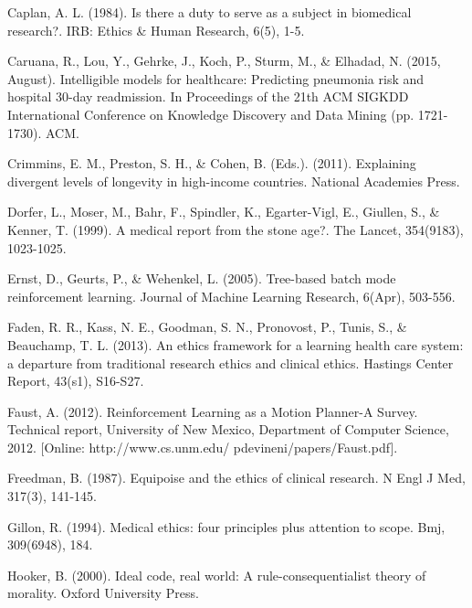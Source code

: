 \documentclass[]{spie}  %
\begin{document}
\indent Caplan, A. L. (1984). Is there a duty to serve as a subject in biomedical research?. IRB: Ethics & Human Research, 6(5), 1-5.

\skiplinehalf

\indent Caruana, R., Lou, Y., Gehrke, J., Koch, P., Sturm, M., & Elhadad, N. (2015, August). Intelligible models for healthcare: Predicting pneumonia risk and hospital 30-day readmission. In Proceedings of the 21th ACM SIGKDD International Conference on Knowledge Discovery and Data Mining (pp. 1721-1730). ACM.

\skiplinehalf

\indent Crimmins, E. M., Preston, S. H., & Cohen, B. (Eds.). (2011). Explaining divergent levels of longevity in high-income countries. National Academies Press.

\skiplinehalf

\indent Dorfer, L., Moser, M., Bahr, F., Spindler, K., Egarter-Vigl, E., Giullen, S., & Kenner, T. (1999). A medical report from the stone age?. The Lancet, 354(9183), 1023-1025.

\skiplinehalf

\indent Ernst, D., Geurts, P., & Wehenkel, L. (2005). Tree-based batch mode reinforcement learning. Journal of Machine Learning Research, 6(Apr), 503-556.

\skiplinehalf

\indent Faden, R. R., Kass, N. E., Goodman, S. N., Pronovost, P., Tunis, S., & Beauchamp, T. L. (2013). An ethics framework for a learning health care system: a departure from traditional research ethics and clinical ethics. Hastings Center Report, 43(s1), S16-S27.

\skiplinehalf

\indent Faust, A. (2012). Reinforcement Learning as a Motion Planner-A Survey. Technical report, University of New Mexico, Department of Computer Science, 2012. [Online: http://www.cs.unm.edu/ pdevineni/papers/Faust.pdf].


\skiplinehalf

\indent Freedman, B. (1987). Equipoise and the ethics of clinical research. N Engl J Med, 317(3), 141-145.

\skiplinehalf

\indent Gillon, R. (1994). Medical ethics: four principles plus attention to scope. Bmj, 309(6948), 184.

\skiplinehalf

\indent Hooker, B. (2000). Ideal code, real world: A rule-consequentialist theory of morality. Oxford University Press.
\end{document}
